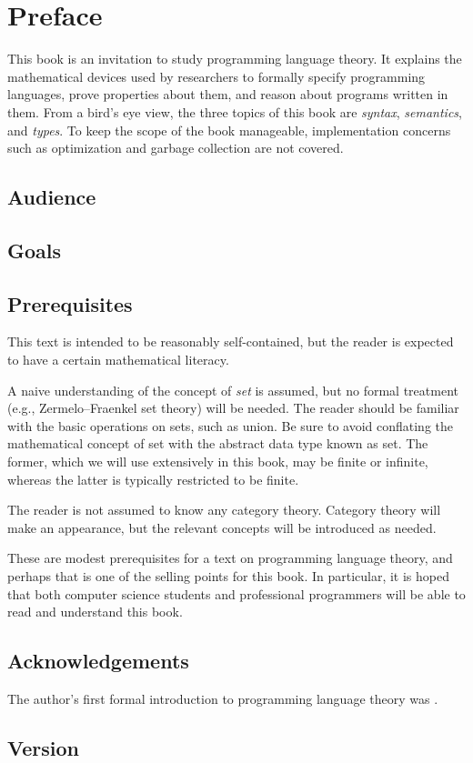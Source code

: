 \chapter{Preface}

  This book is an invitation to study programming language theory. It explains the mathematical devices used by researchers to formally specify programming languages, prove properties about them, and reason about programs written in them. From a bird's eye view, the three topics of this book are \emph{syntax}, \emph{semantics}, and \emph{types}. To keep the scope of the book manageable, implementation concerns such as optimization and garbage collection are not covered.

  \section*{Audience}

  \section*{Goals}

  \section*{Prerequisites}

    This text is intended to be reasonably self-contained, but the reader is expected to have a certain mathematical literacy.

    A naive understanding of the concept of \emph{set} is assumed, but no formal treatment (e.g., Zermelo--Fraenkel set theory) will be needed. The reader should be familiar with the basic operations on sets, such as union. Be sure to avoid conflating the mathematical concept of set with the abstract data type known as set. The former, which we will use extensively in this book, may be finite or infinite, whereas the latter is typically restricted to be finite.

    The reader is not assumed to know any category theory. Category theory will make an appearance, but the relevant concepts will be introduced as needed.

    These are modest prerequisites for a text on programming language theory, and perhaps that is one of the selling points for this book. In particular, it is hoped that both computer science students and professional programmers will be able to read and understand this book.

  \section*{Acknowledgements}

    The author's first formal introduction to programming language theory was \textcite{tapl}.

  \section*{Version}

    
